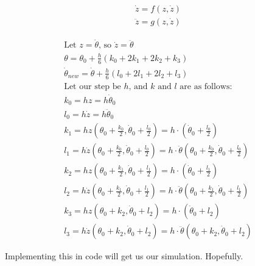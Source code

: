 \documentclass[]{article}
\begin{document}
\begin{gather*}
	\dot{z} = f(z, \dot{z}) \\
	\ddot{z} = g(z, \dot{z})
\end{gather*}

\begin{gather*}
	\text{Let } z = \dot{\theta} \text{, so } \dot{z} = \ddot{\theta} \\
	\theta = \theta_0 + \frac{h}{6}(k_0 + 2k_1 + 2k_2 + k_3) \\
	\dot{\theta}_{new} = \dot{\theta} + \frac{h}{6}(l_0 + 2l_1 + 2l_2 + l_3) \\
	\text{Let our step be $h$, and $k$ and $l$ are as follows:}\\
	k_0 = hz = h\dot{\theta}_0 \\
	l_0 = h\dot{z} = h\ddot{\theta}_0 \\
	k_1 = hz(\theta_0 + \frac{k_0}{2}, \dot{\theta}_0 + \frac{l_0}{2}) = h\cdot(\dot{\theta}_0 + \frac{l_0}{2}) \\
	l_1 = h\dot{z}(\theta_0 + \frac{k_0}{2}, \dot{\theta}_0 + \frac{l_0}{2}) = h\cdot\ddot{\theta}(\theta_0 + \frac{k_0}{2}, \dot{\theta}_0 + \frac{l_0}{2}) \\
	k_2 = hz(\theta_0 + \frac{k_1}{2}, \dot{\theta}_0 + \frac{l_1}{2}) = h\cdot(\dot{\theta}_0 + \frac{l_1}{2}) \\
	l_2 = h\dot{z}(\theta_0 + \frac{k_1}{2}, \dot{\theta}_0 + \frac{l_1}{2}) = h\cdot\ddot{\theta}(\theta_0 + \frac{k_1}{2}, \dot{\theta}_0 + \frac{l_1}{2}) \\
	k_3 = hz(\theta_0 + k_2, \dot{\theta}_0 + l_2) = h\cdot(\dot{\theta}_0 + l_2) \\
	l_3 = h\dot{z}(\theta_0 + k_2, \dot{\theta}_0 + l_2) = h\cdot\ddot{\theta}(\theta_0 + k_2, \dot{\theta}_0 + l_2)
\end{gather*}

Implementing this in code will get us our simulation. Hopefully.
\end{document}
